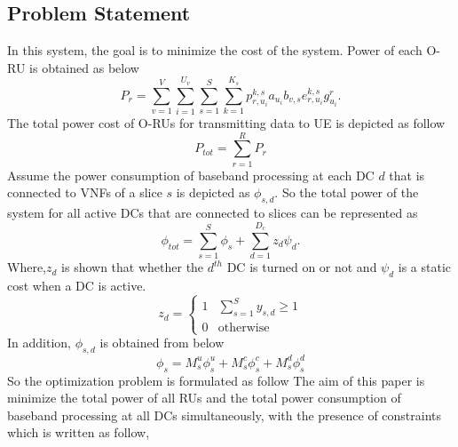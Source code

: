 \documentclass[conference]{IEEEtran}
\begin{document}
\subsection{Problem Statement}
In this system, the goal is to minimize the cost of the system.
Power of each O-RU is obtained as below
\begin{equation}
P_r =  \sum_{v=1}^{V} \sum_{i=1}^{U_v} \sum_{s=1}^{S} \sum_{k=1}^{K_s}p_{r,u_i}^{k,s}a_{u_i} b_{v, s} e^{k,s}_{r,u_i}g_{u_i}^r.
\end{equation}
The total power cost of O-RUs for transmitting data to UE is depicted as follow
\begin{equation}
P_{tot} = \sum_{r=1}^{R}P_r
\end{equation}
Assume the power consumption of baseband processing at each DC $d$ that is connected to VNFs of a slice $s$ is depicted as
$\phi_{s,d}$. So the total power of the system for all active DCs that are connected to slices can be represented as
\begin{equation*}
\textstyle \phi_{tot} = \sum_{s=1}^{S}\phi_{s} + \sum_{d=1}^{D_c}z_d \psi_d .
\end{equation*}
Where,$z_d$ is shown that whether the $d^{th}$ DC is turned on or not and $\psi_d$ is a static cost when a DC is active.
\begin{equation}
  z_d =
    \begin{cases}
      1 & \sum_{s=1}^{S}y_{s,d} \geq 1 \\
      0 & \text{otherwise}
    \end{cases}       
\end{equation}  
In addition, $\phi_{s,d}$ is obtained from below
\begin{equation}
\phi_{s} = M_s^u \phi_s^u + M_s^c \phi_s^c+ M_s^d \phi_s^d
\end{equation}
So the optimization problem is formulated as follow
The aim of this paper is minimize the total power of all RUs and the total power consumption of baseband processing at all DCs simultaneously, with the presence of constraints which is written as follow,
\end{document}
